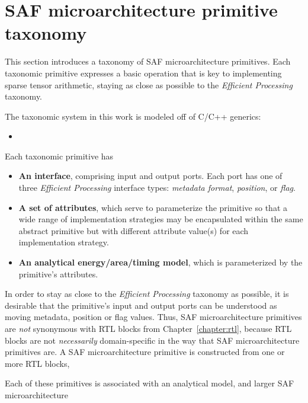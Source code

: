 \chapter{SAF microarchitecture primitive taxonomy}
\label{chapter:primitive_taxo_model}

This section introduces a taxonomy of SAF microarchitecture primitives. Each taxonomic primitive expresses a basic operation that is key to implementing sparse tensor arithmetic, staying as close as possible to the \textit{Efficient Processing}\cite{szebook} taxonomy. 

The taxonomic system in this work is modeled off of C/C++ generics: 

\begin{itemize}
    \item 
\end{itemize}

Each taxonomic primitive has

\begin{itemize}
    \item \textbf{An interface}, comprising input and output ports. Each port has one of three \textit{Efficient Processing} interface types: \textit{metadata format}, \textit{position}, or \textit{flag}.
    \item \textbf{A set of attributes}, which serve to parameterize the primitive so that a wide range of implementation strategies may be encapsulated within the same abstract primitive but with different attribute value(s) for each implementation strategy.
    \item \textbf{An analytical energy/area/timing model}, which is parameterized by the primitive's attributes.
\end{itemize}

In order to stay as close to the \textit{Efficient Processing} taxonomy as possible, it is desirable that the primitive's input and output ports can be understood as moving metadata, position or flag values. Thus, SAF microarchitecture primitives are \textit{not} synonymous with RTL blocks from Chapter~\ref{chapter:rtl}, because RTL blocks are not \textit{necessarily} domain-specific in the way that SAF microarchitecture primitives are. A SAF microarchitecture primitive is constructed from one or more RTL blocks, 

Each of these primitives is associated with an analytical model, and larger SAF microarchitecture

